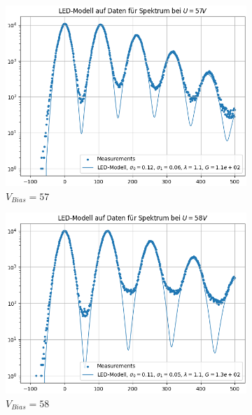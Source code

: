 \documentclass[12pt]{article}
\begin{document}
\begin{figure}[h!]
  \centering
  \begin{subfigure}{0.49\textwidth}
    \includegraphics[width=\textwidth]{Grafiken/modell 57}
    \caption{$V_{Bias}=57$}
  \end{subfigure}
  \begin{subfigure}{0.49\textwidth}
    \includegraphics[width=\textwidth]{Grafiken/modell 58}
    \caption{$V_{Bias}=58$}
  \end{subfigure}
  \begin{subfigure}{0.49\textwidth}

\end{subfigure}
\end{figure}
\end{document}
